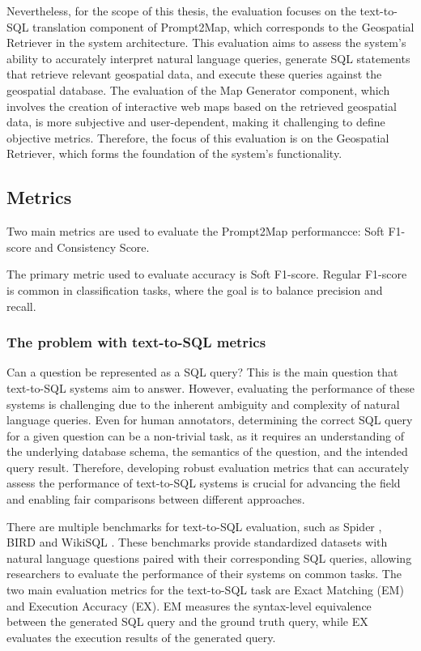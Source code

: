 Nevertheless, for the scope of this thesis, the evaluation focuses on the text-to-SQL translation component of Prompt2Map, which corresponds to the Geospatial Retriever in the system architecture. This evaluation aims to assess the system's ability to accurately interpret natural language queries, generate SQL statements that retrieve relevant geospatial data, and execute these queries against the geospatial database. The evaluation of the Map Generator component, which involves the creation of interactive web maps based on the retrieved geospatial data, is more subjective and user-dependent, making it challenging to define objective metrics. Therefore, the focus of this evaluation is on the Geospatial Retriever, which forms the foundation of the system's functionality.


\subsection{Metrics}

Two main metrics are used to evaluate the Prompt2Map performancce: Soft F1-score and Consistency Score.


The primary metric used to evaluate accuracy is Soft F1-score. Regular F1-score is common in classification tasks, where the goal is to balance precision and recall.

\subsubsection{The problem with text-to-SQL metrics}

Can a question be represented as a SQL query? This is the main question that text-to-SQL systems aim to answer. However, evaluating the performance of these systems is challenging due to the inherent ambiguity and complexity of natural language queries. Even for human annotators, determining the correct SQL query for a given question can be a non-trivial task, as it requires an understanding of the underlying database schema, the semantics of the question, and the intended query result. Therefore, developing robust evaluation metrics that can accurately assess the performance of text-to-SQL systems is crucial for advancing the field and enabling fair comparisons between different approaches.

There are multiple benchmarks for text-to-SQL evaluation, such as Spider \cite{yu_spider_2018}, BIRD \cite{li_can_2023} and WikiSQL \cite{zhongSeq2SQL2017}. These benchmarks provide standardized datasets with natural language questions paired with their corresponding SQL queries, allowing researchers to evaluate the performance of their systems on common tasks. The two main evaluation metrics for the text-to-SQL task are Exact Matching (EM) and Execution Accuracy (EX). EM measures the syntax-level equivalence between the generated SQL query and the ground truth query, while EX evaluates the execution results of the generated query.

